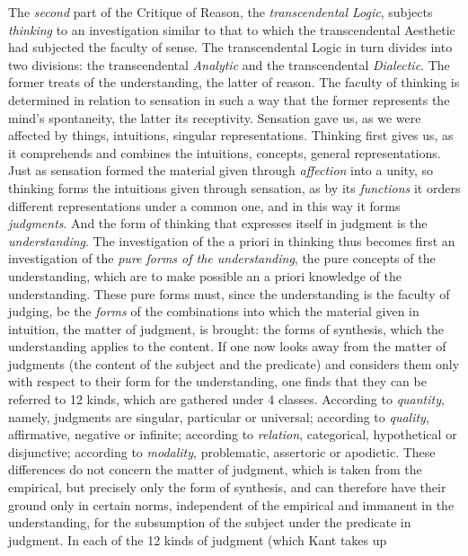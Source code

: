 \divrule

The \emph{second} part of the Critique of Reason, the \emph{transcendental
Logic}, subjects \emph{thinking} to an investigation similar to that to
which the transcendental Aesthetic had subjected the faculty of sense. The
transcendental Logic in turn divides into two divisions: the transcendental
\emph{Analytic} and the transcendental \emph{Dialectic}. The former treats
of the understanding, the latter of reason. The faculty of thinking is
determined in relation to sensation in such a way that the former
represents the mind's spontaneity, the latter its receptivity. Sensation
gave us, as we were affected by things, intuitions, singular
representations. Thinking first gives us, as it comprehends and combines
the intuitions, concepts, general representations. Just as sensation
formed the material given through \emph{affection} into a unity, so
thinking forms the intuitions given through sensation, as by its
\emph{functions} it orders different representations under a common one,
and in this way it forms \emph{judgments}. And the form of thinking that
expresses itself in judgment is the \emph{understanding}. The
investigation of the a priori in thinking thus becomes first an
investigation of the \emph{pure forms of the understanding}, the pure
concepts of the understanding, which are to make possible an a priori
knowledge of the understanding. These pure forms must, since the
understanding is the faculty of judging, be the \emph{forms} of the
combinations into which the material given in intuition, the matter of
judgment, is brought: the forms of synthesis, which the understanding
applies to the content. If one now looks away from the matter of
judgments (the content of the subject and the
predicate) and considers them only with respect to their form
for the understanding, one finds that they can be referred to 12 kinds,
which are gathered under 4 classes. According to \emph{quantity},
namely, judgments are singular, particular or universal; according to
\emph{quality}, affirmative, negative or infinite; according to
\emph{relation}, categorical, hypothetical or disjunctive; according to
\emph{modality}, problematic, assertoric or apodictic. These differences
do not concern the matter of judgment, which is taken from the empirical,
but precisely only the form of synthesis, and can therefore have their
ground only in certain norms, independent of the empirical and immanent in
the understanding, for the subsumption of the subject under the predicate
in judgment. In each of the 12 kinds of judgment (which Kant takes up
